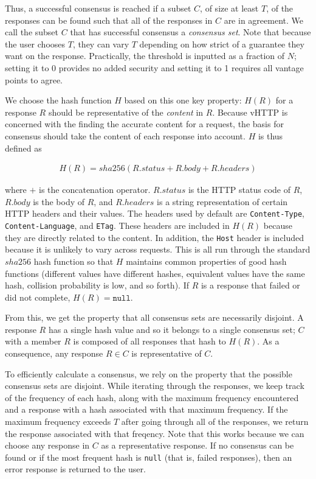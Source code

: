 Thus, a successful consensus is reached if a subset $C$, of size at least $T$,
of the responses can be found such that all of the responses in $C$ are in
agreement. We call the subset $C$ that has successful consensus a
\textit{consensus set}. Note that because the user chooses $T$, they can vary
$T$ depending on how strict of a guarantee they want on the response.
Practically, the threshold is inputted as a fraction of $N$; setting it to 0
provides no added security and setting it to 1 requires all vantage points to
agree. 

We choose the hash function $H$ based on this one key property: $H(R)$ for a
response $R$ should be representative of the \emph{content} in $R$. Because
vHTTP is concerned with the finding the accurate content for a request, the
basis for consensus should take the content of each response into account.
$H$ is thus defined as

\begin{align*}
  H(R) = sha256(R.status + R.body + R.headers)
\end{align*}

where $+$ is the concatenation operator. $R.status$ is the HTTP status code of
$R$, $R.body$ is the body of $R$, and $R.headers$ is a string representation
of certain HTTP headers and their values. The headers used by default are
\texttt{Content-Type}, \texttt{Content-Language}, and \texttt{ETag}. These
headers are included in $H(R)$ because they are directly related to the
content. In addition, the \texttt{Host} header is included because it is
unlikely to vary across requests. This is all run through the standard $sha256$
hash function so that $H$ maintains common properties of good hash functions
(different values have different hashes, equivalent values have the same hash,
collision probability is low, and so forth). If $R$ is a response that failed
or did not complete, $H(R) = \texttt{null}$.

From this, we get the property that all consensus sets are necessarily
disjoint. A response $R$ has a single hash value and so it belongs to a single
consensus set; $C$ with a member $R$ is composed of all responses that hash to
$H(R)$. As a consequence, any response $R \in C$ is representative of $C$.

To efficiently calculate a consensus, we rely on the property that the possible
consensus sets are disjoint. While iterating through the responses, we
keep track of the frequency of each hash, along with the maximum frequency
encountered and a response with a hash associated with that maximum frequency.
If the maximum frequency exceeds $T$ after going through all of the responses,
we return the response associated with that freqency. Note that this works
because we can choose any response in $C$ as a representative response.
If no consensus can be found or if the most frequent hash is \texttt{null}
(that is, failed responses), then an error response is returned to the user.

